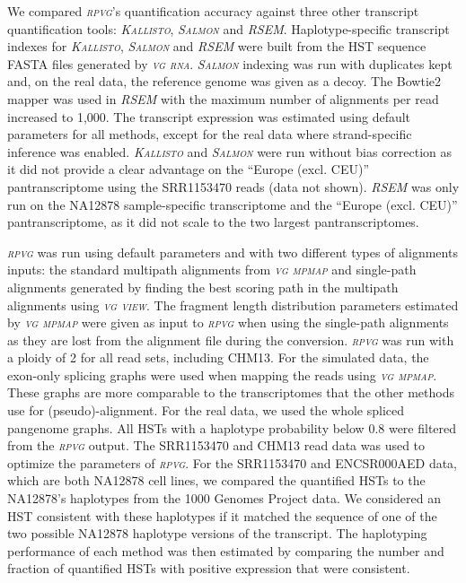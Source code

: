 \documentclass[11pt]{ucthesis}
\newcommand{\tool}[1]{\emph{\textsc{#1}}}
\begin{document}
We compared \tool{rpvg}'s quantification accuracy against three other transcript quantification tools: \tool{Kallisto}, \tool{Salmon} and \tool{RSEM}. Haplotype-specific transcript indexes for \tool{Kallisto}, \tool{Salmon} and \tool{RSEM} were built from the HST sequence FASTA files generated by \tool{vg rna}. \tool{Salmon} indexing was run with duplicates kept and, on the real data, the reference genome was given as a decoy. The Bowtie2 mapper was used in \tool{RSEM} with the maximum number of alignments per read increased to 1,000. The transcript expression was estimated using default parameters for all methods, except for the real data where strand-specific inference was enabled. \tool{Kallisto} and \tool{Salmon} were run without bias correction as it did not provide a clear advantage on the ``Europe (excl. CEU)'' pantranscriptome using the SRR1153470 reads (data not shown). \tool{RSEM} was only run on the NA12878 sample-specific transcriptome and the ``Europe (excl. CEU)'' pantranscriptome, as it did not scale to the two largest pantranscriptomes. 

\tool{rpvg} was run using default parameters and with two different types of alignments inputs: the standard multipath alignments from \tool{vg mpmap} and single-path alignments generated by finding the best scoring path in the multipath alignments using \tool{vg view}. The fragment length distribution parameters estimated by \tool{vg mpmap} were given as input to \tool{rpvg} when using the single-path alignments as they are lost from the alignment file during the conversion. \tool{rpvg} was run with a ploidy of 2 for all read sets, including CHM13. For the simulated data, the exon-only splicing graphs were used when mapping the reads using \tool{vg mpmap}. These graphs are more comparable to the transcriptomes that the other methods use for (pseudo)-alignment. For the real data, we used the whole spliced pangenome graphs. All HSTs with a haplotype probability below 0.8 were filtered from the \tool{rpvg} output. The SRR1153470 and CHM13 read data was used to optimize the parameters of \tool{rpvg}.  
\newline 
\newline
For the SRR1153470 and ENCSR000AED data, which are both NA12878 cell lines, we compared the quantified HSTs to the NA12878's haplotypes from the 1000 Genomes Project data. We considered an HST consistent with these haplotypes if it matched the sequence of one of the two possible NA12878 haplotype versions of the transcript. The haplotyping performance of each method was then estimated by comparing the number and fraction of quantified HSTs with positive expression that were consistent. 
\end{document}

